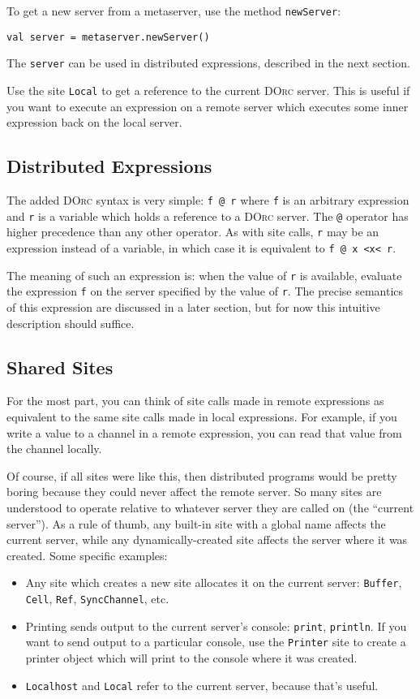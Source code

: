 \documentclass[10pt,letterpaper]{article}
\begin{document}
To get a new server from a metaserver, use the method \texttt{newServer}:
\begin{verbatim}
val server = metaserver.newServer()
\end{verbatim}
The \texttt{server} can be used in distributed expressions, described in the
next section.

Use the site \texttt{Local} to get a reference to the current \textsc{DOrc}
server. This is useful if you want to execute an expression on a
remote server which executes some inner expression back on the local server.

\subsection{Distributed Expressions}

The added \textsc{DOrc} syntax is very simple: \texttt{f @ r} where \texttt{f}
is an arbitrary expression and \texttt{r} is a variable which holds a reference
to a \textsc{DOrc} server. The \texttt{@} operator has higher precedence than
any other operator. As with site calls, \texttt{r} may be an expression instead
of a variable, in which case it is equivalent to \texttt{f @ x <x< r}.

The meaning of such an expression is: when the value of \texttt{r} is
available, evaluate the expression \texttt{f} on the server specified by the
value of \texttt{r}. The precise semantics of this expression are discussed in
a later section, but for now this intuitive description should suffice.

\subsection{Shared Sites}

For the most part, you can think of site calls made in remote expressions as
equivalent to the same site calls made in local expressions. For example, if
you write a value to a channel in a remote expression, you can read that value
from the channel locally.

Of course, if all sites were like this, then distributed programs would be
pretty boring because they could never affect the remote server. So many sites
are understood to operate relative to whatever server they are called on (the
``current server''). As a rule of thumb, any built-in site with a global name
affects the current server, while any dynamically-created site affects the
server where it was created. Some specific examples:
\begin{itemize}
\item Any site which creates a new site allocates it on the current
server: \texttt{Buffer}, \texttt{Cell}, \texttt{Ref}, \texttt{SyncChannel}, etc.
\item Printing sends output to the current server's console: \texttt{print},
\texttt{println}. If you want to send output to a particular console, use the
\texttt{Printer} site to create a printer object which will print to the
console where it was created.
\item \texttt{Localhost} and \texttt{Local} refer to the current server, because that's useful.
\end{itemize}
\end{document}
